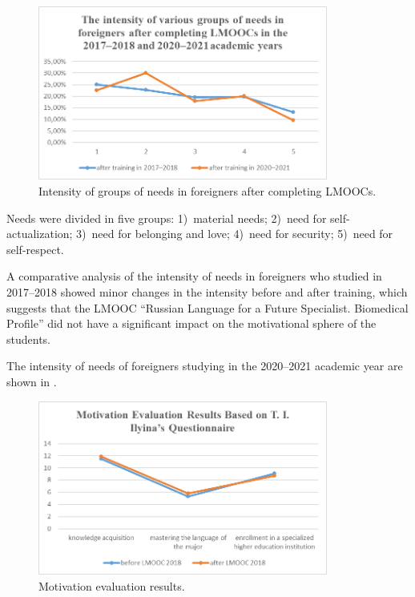 \documentclass[english]{textolivre}
\begin{document}
\begin{figure}[htbp]
 \centering
 \includegraphics[width=0.85\textwidth]{Fig1.png}
 \caption{Intensity of groups of needs in foreigners after completing LMOOCs.}
 \label{fig01}
\end{figure}

Needs were divided in five groups: 1) material needs; 2) need for self-actualization; 3) need for belonging and love; 4) need for security; 5) need for self-respect.

A comparative analysis of the intensity of needs in foreigners who studied in 2017–2018 showed minor changes in the intensity before and after training, which suggests that the LMOOC “Russian Language for a Future Specialist. Biomedical Profile” did not have a significant impact on the motivational sphere of the students.

The intensity of needs of foreigners studying in the 2020–2021 academic year are shown in .

\begin{figure}[htbp]
 \centering
 \includegraphics[width=0.85\textwidth]{Fig2.png}
 \caption{Motivation evaluation results.}
 \label{fig02}
\end{figure}
\end{document}
